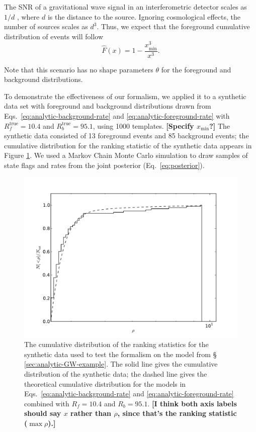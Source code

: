 \documentclass[aps,prd]{revtex4-1}
\newcommand{\xmin}{x_\mathrm{min}}
\newcommand{\ilya}[1]{{\color{red} \bf #1}}
\begin{document}
The SNR of a gravitational wave signal in an interferometric detector
scales as $1/d$ \citep{Finn1992}, where $d$ is the distance to the
source.  Ignoring cosmological effects, the number of sources scales
as $d^3$.  Thus, we expect that the foreground cumulative distribution
of events will follow
\begin{equation}
  \label{eq:analytic-foreground-rate}
  \hat{F}(x) = 1 - \frac{\xmin^3}{x^3}.
\end{equation}

Note that this scenario has no shape parameters $\theta$ for the
foreground and background distributions.

To demonstrate the effectiveness of our formalism, we applied it to a
synthetic data set with foreground and background distributions drawn
from Eqs.~\eqref{eq:analytic-background-rate} and
\eqref{eq:analytic-foreground-rate} with $R_f^\mathrm{true} = 10.4$
and $R_b^\mathrm{true} = 95.1$, using 1000 templates.  \ilya{[Specify
    $\xmin$?]} The synthetic data consisted of 13 foreground events
and 85 background events; the cumulative distribution for the ranking
statistic of the synthetic data appears in Figure
\ref{fig:analytic-data-cumulative}.  We used a Markov Chain Monte
Carlo simulation to draw samples of state flags and rates from the
joint posterior (Eq.~\eqref{eq:posterior}).

\begin{figure}
  \includegraphics[width=\columnwidth]{data}
  \caption{\label{fig:analytic-data-cumulative} The cumulative
    distribution of the ranking statistics for the synthetic data used
    to test the formalism on the model from \S
    \ref{sec:analytic-GW-example}.  The solid line gives the
    cumulative distribution of the synthetic data; the dashed line
    gives the theoretical cumulative distribution for the models in
    Eqs.~\eqref{eq:analytic-background-rate} and
    \eqref{eq:analytic-foreground-rate} combined with $R_f = 10.4$ and
    $R_b = 95.1$. \ilya{[I think both axis labels should say $x$
        rather than $\rho$, since that's the ranking statistic ($\max
        \rho$).]}}
\end{figure}
\end{document}
